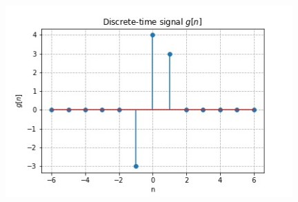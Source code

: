 \documentclass[journal,12pt,twocolumn]{IEEEtran}
\begin{document}
\begin{figure}[h]
    \includegraphics[width=11cm]{g[n] signal.jpg}
\end{figure}
\end{document}

